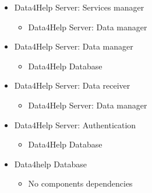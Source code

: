 \begin{itemize}
			\item{Data4Help Server: Services manager}
			\begin{itemize}\item{Data4Help Server: Data manager}\end{itemize}

			\item{Data4Help Server: Data manager}
			\begin{itemize}\item{Data4Help Database}\end{itemize}

			\item{Data4Help Server: Data receiver}
			\begin{itemize}\item{Data4Help Server: Data manager}\end{itemize}

			\item{Data4Help Server: Authentication}
			\begin{itemize}\item{Data4Help Database}\end{itemize}

			\item{Data4help Database}
			\begin{itemize}\item{No components dependencies}\end{itemize}
			
		\end{itemize}

